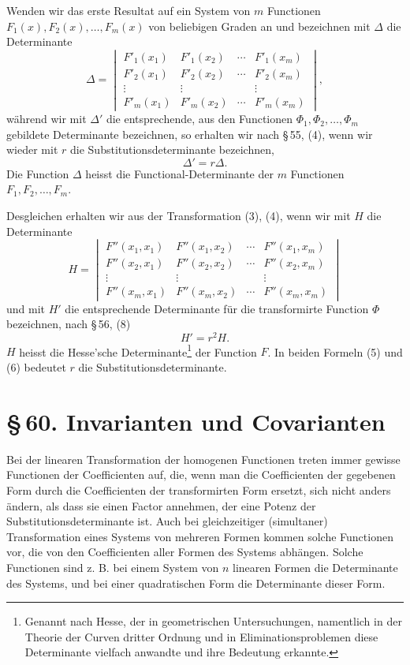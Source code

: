 \documentclass[11pt]{article}
\providecommand{\sect}[2]{\section*{\S\,#1. #2}}
\begin{document}
Wenden wir das erste Resultat auf ein System von $m$ Functionen $F_1(x),F_2(x),\ldots,F_m(x)$ von beliebigen Graden an und bezeichnen mit $\Delta$ die Determinante
\[
\Delta=\begin{vmatrix}
 F'_1(x_1)&F'_1(x_2)&\cdots&F'_1(x_m)\\
 F'_2(x_1)&F'_2(x_2)&\cdots&F'_2(x_m)\\
 \vdots&\vdots&&\vdots\\
 F'_m(x_1)&F'_m(x_2)&\cdots&F'_m(x_m)
\end{vmatrix},
\]
während wir mit $\Delta'$ die entsprechende, aus den Functionen $\Phi_1,\Phi_2,\ldots,\Phi_m$ gebildete Determinante bezeichnen, so erhalten wir nach \S\,55, (4), wenn wir wieder mit $r$ die Substitutionsdeterminante bezeichnen,
\begin{equation}
 \Delta'=r\Delta.
\tag{5}
\end{equation}
Die Function $\Delta$ heisst die Functional-Determinante der $m$ Functionen $F_1,F_2,\ldots,F_m$.

Desgleichen erhalten wir aus der Transformation (3), (4), wenn wir mit $H$ die Determinante
\[
H=\begin{vmatrix}
 F''(x_1,x_1)&F''(x_1,x_2)&\cdots&F''(x_1,x_m)\\
 F''(x_2,x_1)&F''(x_2,x_2)&\cdots&F''(x_2,x_m)\\
 \vdots&\vdots&&\vdots\\
 F''(x_m,x_1)&F''(x_m,x_2)&\cdots&F''(x_m,x_m)
\end{vmatrix}
\]
und mit $H'$ die entsprechende Determinante für die transformirte Function $\Phi$ bezeichnen, nach \S\,56, (8)
\begin{equation}
 H'=r^2H.
\tag{6}
\end{equation}
$H$ heisst die Hesse'sche Determinante\footnote{Genannt nach Hesse, der in geometrischen Untersuchungen, namentlich in der Theorie der Curven dritter Ordnung und in Eliminationsproblemen diese Determinante vielfach anwandte und ihre Bedeutung erkannte.} der Function $F$. In beiden Formeln (5) und (6) bedeutet $r$ die Substitutionsdeterminante.

\sect{60}{Invarianten und Covarianten}

Bei der linearen Transformation der homogenen Functionen treten immer gewisse Functionen der Coefficienten auf, die, wenn man die Coefficienten der gegebenen Form durch die Coefficienten der transformirten Form ersetzt, sich nicht anders ändern, als dass sie einen Factor annehmen, der eine Potenz der Substitutionsdeterminante ist. Auch bei gleichzeitiger (simultaner) Transformation eines Systems von mehreren Formen kommen solche Functionen vor, die von den Coefficienten aller Formen des Systems abhängen. Solche Functionen sind z. B. bei einem System von $n$ linearen Formen die Determinante des Systems, und bei einer quadratischen Form die Determinante dieser Form.
\end{document}
